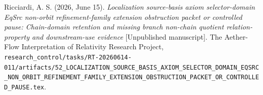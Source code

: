 \documentclass[11pt]{article}
\begin{document}
Ricciardi, A. S. (2026, June 15). \emph{Localization source-basis axiom
selector-domain EqSrc non-orbit refinement-family extension obstruction
packet or controlled pause: Chain-domain retention and missing branch
non-chain quotient relation-property and downstream-use evidence}
[Unpublished manuscript]. The Aether-Flow Interpretation of Relativity
Research Project,
\texttt{research\_control/tasks/RT-20260614-011/artifacts/52\_LOCALIZATION\_SOURCE\_BASIS\_AXIOM\_SELECTOR\_DOMAIN\_EQSRC\_NON\_ORBIT\_REFINEMENT\_FAMILY\_EXTENSION\_OBSTRUCTION\_PACKET\_OR\_CONTROLLED\_PAUSE.tex}.
\end{document}
